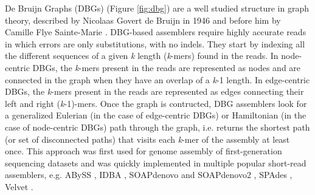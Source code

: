 De Bruijn Graphs (DBGs) (Figure \ref{fig:dbg}) are a well studied structure in graph theory, described by Nicolaas Govert de Bruijn in 1946 \cite{dbg} and before him by Camille Flye Sainte-Marie \cite{flyesaintemarie}. DBG-based assemblers require highly accurate reads in which errors are only substitutions, with no indels. They start by indexing all the different sequences of a given \textit{k} length (\textit{k}-mers) found in the reads. In node-centric DBGs, the \textit{k}-mers present in the reads are represented as nodes and are connected in the graph when they have an overlap of a \textit{k}-1 length. In edge-centric DBGs, the  \textit{k}-mers present in the reads are represented as edges connecting their left and right (\textit{k}-1)-mers. Once the graph is contructed, DBG assemblers look for a generalized Eulerian (in the case of edge-centric DBGs) or Hamiltonian (in the case of node-centric DBGs) path through the graph, i.e. returns the shortest path (or set of disconnected paths) that visits each \textit{k}-mer of the assembly at least once. This approach was first used for genome assembly of first-generation sequencing datasets \cite{Compeau2011} and was quickly implemented in multiple popular short-read assemblers, e.g. ABySS \cite{abyss, abyss2}, IDBA \cite{idba}, SOAPdenovo \cite{soapdenovo} and SOAPdenovo2 \cite{soapdenovo2}, SPAdes \cite{spades}, Velvet \cite{velvet}. \\

